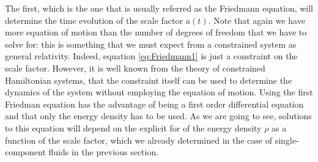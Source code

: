 The first, which is the one that is usually referred as the Friedmann equation, will determine the time evolution of the scale factor $a(t)$. Note that again we have more equation of motion than the number of degrees of freedom that we have to solve for: this is something that we must expect from a constrained system as general relativity. Indeed, equation \eqref{eq:Friedmann1} is just a constraint on the scale factor. However, it is well known from the theory of constrained Hamiltonian systems, that the constraint itself can be used to determine the dynamics of the system without employing the equation of motion. Using the first Friedman equation has the advantage of being a first order differential equation and that only the energy density has to be used. As we are going to see, solutions to this equation will depend on the explicit for of the energy density $\rho$ as a function of the scale factor, which we already determined in the case of single-component fluids in the previous section.  

